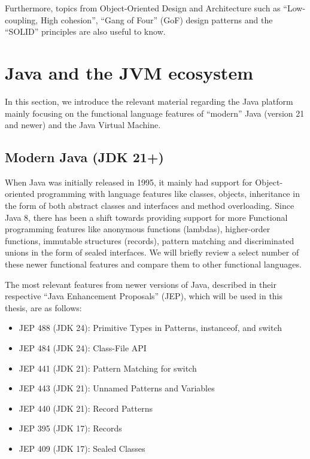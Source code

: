 Furthermore, topics from Object-Oriented Design and Architecture such as ``Low-coupling, High cohesion'', ``Gang of Four'' (GoF) design patterns
and the ``SOLID'' principles are also useful to know.

\section{Java and the JVM ecosystem}

In this section, we introduce the relevant material regarding the Java platform mainly focusing
on the functional language features of ``modern'' Java (version 21 and newer) and the Java Virtual
Machine.

\subsection{Modern Java (JDK 21+)}

When Java was initially released in 1995, it mainly had support for Object-oriented 
programming with language features like classes, objects, 
inheritance in the form of both abstract classes and interfaces and method overloading.
Since Java 8, there has been a shift towards providing support for more Functional 
programming features like anonymous functions (lambdas), higher-order functions, immutable
structures (records), pattern matching and discriminated unions in the form of sealed 
interfaces. We will briefly review a select number of these newer functional features
and compare them to other functional languages.

The most relevant features from newer versions of Java, described in their respective ``Java Enhancement Proposals'' (JEP), which will be used in this thesis, are as follows:

\begin{itemize}
    \item JEP 488 (JDK 24): Primitive Types in Patterns, instanceof, and switch
    \item JEP 484 (JDK 24): Class-File API
    \item JEP 441 (JDK 21): Pattern Matching for switch
    \item JEP 443 (JDK 21): Unnamed Patterns and Variables
    \item JEP 440 (JDK 21): Record Patterns
    \item JEP 395 (JDK 17): Records
    \item JEP 409 (JDK 17): Sealed Classes
\end{itemize}

